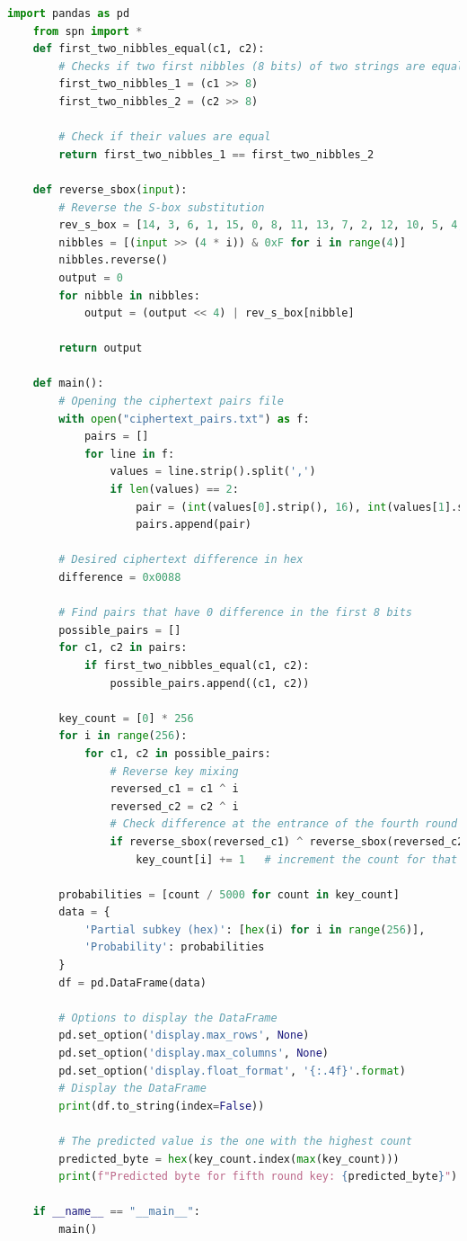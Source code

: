\documentclass[letterpaper,12pt]{article}
\begin{document}
\begin{lstlisting}[language=Python, caption=Python code for subkey count and retrieval by Matthieu, label=lts:att]
    import pandas as pd
    from spn import *
    def first_two_nibbles_equal(c1, c2):
        # Checks if two first nibbles (8 bits) of two strings are equal
        first_two_nibbles_1 = (c1 >> 8)
        first_two_nibbles_2 = (c2 >> 8)
        
        # Check if their values are equal
        return first_two_nibbles_1 == first_two_nibbles_2

    def reverse_sbox(input):
        # Reverse the S-box substitution
        rev_s_box = [14, 3, 6, 1, 15, 0, 8, 11, 13, 7, 2, 12, 10, 5, 4, 9]
        nibbles = [(input >> (4 * i)) & 0xF for i in range(4)]
        nibbles.reverse()
        output = 0
        for nibble in nibbles:
            output = (output << 4) | rev_s_box[nibble]
        
        return output
        
    def main():
        # Opening the ciphertext pairs file
        with open("ciphertext_pairs.txt") as f:
            pairs = []
            for line in f:
                values = line.strip().split(',')
                if len(values) == 2:
                    pair = (int(values[0].strip(), 16), int(values[1].strip(), 16))
                    pairs.append(pair)

        # Desired ciphertext difference in hex
        difference = 0x0088

        # Find pairs that have 0 difference in the first 8 bits
        possible_pairs = []
        for c1, c2 in pairs:
            if first_two_nibbles_equal(c1, c2):
                possible_pairs.append((c1, c2))
        
        key_count = [0] * 256
        for i in range(256):
            for c1, c2 in possible_pairs:
                # Reverse key mixing
                reversed_c1 = c1 ^ i
                reversed_c2 = c2 ^ i
                # Check difference at the entrance of the fourth round
                if reverse_sbox(reversed_c1) ^ reverse_sbox(reversed_c2) == difference:
                    key_count[i] += 1   # increment the count for that value
        
        probabilities = [count / 5000 for count in key_count]
        data = {
            'Partial subkey (hex)': [hex(i) for i in range(256)],
            'Probability': probabilities
        }
        df = pd.DataFrame(data)

        # Options to display the DataFrame
        pd.set_option('display.max_rows', None)
        pd.set_option('display.max_columns', None)
        pd.set_option('display.float_format', '{:.4f}'.format)
        # Display the DataFrame
        print(df.to_string(index=False))
        
        # The predicted value is the one with the highest count
        predicted_byte = hex(key_count.index(max(key_count)))
        print(f"Predicted byte for fifth round key: {predicted_byte}")

    if __name__ == "__main__":
        main()
    \end{lstlisting}
\end{document}
